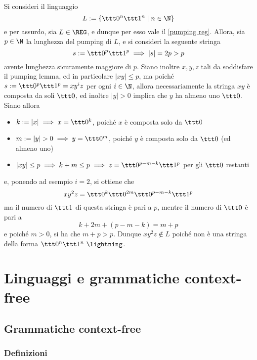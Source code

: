 \documentclass[a4paper, 12pt]{report}
\begin{document}
    \begin{example}
        \label{non reg ex}
        Si consideri il linguaggio $$L := \{\ttt 0 ^n \ttt 1 ^n \mid n \in \N\}$$ e per assurdo, sia $L \in \mathrm{\REG}$, e dunque per esso vale il \cref{pumping reg}. Allora, sia $p \in \N$ la lunghezza del pumping di $L$, e si consideri la seguente stringa $$s := \ttt 0 ^p \ttt 1^p \implies |s| = 2p > p$$ avente lunghezza sicuramente maggiore di $p$. Siano inoltre $x, y, z$ tali da soddisfare il pumping lemma, ed in particolare $|xy| \le p$, ma poiché $s := \ttt 0^p \ttt 1^p = xy^iz$ per ogni $i \in \N$, allora necessariamente la stringa $xy$ è composta da soli $\ttt 0$, ed inoltre $|y| > 0$ implica che $y$ ha almeno uno $\ttt 0$. Siano allora

        \begin{itemize}
            \item $k := |x| \implies x = \ttt 0^k$, poiché $x$ è composta solo da $\ttt 0$
            \item $m := |y| > 0 \implies y = \ttt 0^m$, poiché $y$ è composta solo da $\ttt 0$ (ed almeno uno)
            \item $|xy| \le p \implies k + m \le p \implies z = \ttt 0^{p-m-k} \ttt 1^p$ per gli $\ttt 0$ restanti
        \end{itemize}

        e, ponendo ad esempio $i = 2$, si ottiene che $$xy^2z = \ttt 0^k \ttt 0^{2m} \ttt 0^{p-m-k} \ttt 1^p$$ ma il numero di $\ttt 1$ di questa stringa è pari a $p$, mentre il numero di $\ttt 0$ è pari a $$k + 2m + (p - m - k) = m + p$$ e poiché $m > 0$, si ha che $m + p > p$. Dunque $xy^2z \notin L$ poiché non è una stringa della forma $\ttt 0 ^n \ttt 1^n \ \lightning$.
    \end{example}

    \chapter{Linguaggi e grammatiche context-free}

    \section{Grammatiche context-free}

    \subsection{Definizioni}
\end{document}
